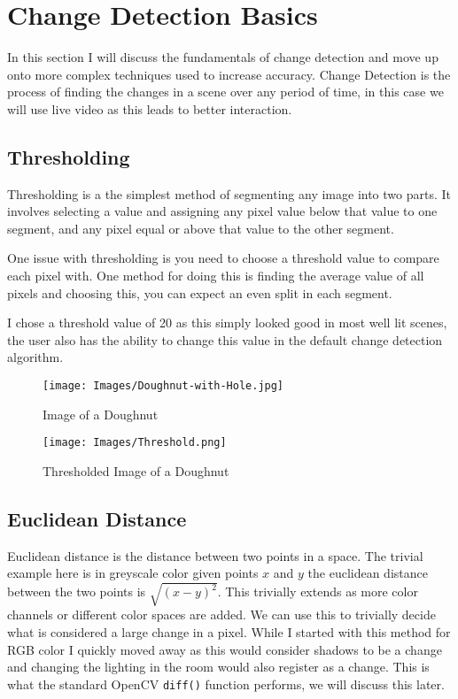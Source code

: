 \documentclass[a4paper]{report}
\begin{document}
\section{Change Detection Basics}
In this section I will discuss the fundamentals of change detection and move up onto more complex techniques used to increase accuracy. Change Detection is the process of finding the changes in a scene over any period of time, in this case we will use live video as this leads to better interaction.

\subsection{Thresholding}
Thresholding is a the simplest method of segmenting any image into two parts. It involves selecting a value and assigning any pixel value below that value to one segment, and any pixel equal or above that value to the other segment.

One issue with thresholding is you need to choose a threshold value to compare each pixel with. One method for doing this is finding the average value of all pixels and choosing this, you can expect an even split in each segment.

I chose a threshold value of 20 as this simply looked good in most well lit scenes, the user also has the ability to change this value in the default change detection algorithm.
\clearpage

\begin{figure}[!ht]
\centering
\texttt{[image: Images/Doughnut-with-Hole.jpg]}
\caption{\label{fig:Doughnut} Image of a Doughnut}
\end{figure}

\begin{figure}[!ht]
\centering
\texttt{[image: Images/Threshold.png]}
\caption{\label{fig:Doughnut} Thresholded Image of a Doughnut}
\end{figure}

\subsection{Euclidean Distance}
Euclidean distance is the distance between two points in a space. The trivial example here is in greyscale color given points $x$ and $y$ the euclidean distance between the two points is $\sqrt{(x-y)^2}$. This trivially extends as more color channels or different color spaces are added. We can use this to trivially decide what is considered a large change in a pixel. While I started with this method for RGB color I quickly moved away as this would consider shadows to be a change and changing the lighting in the room would also register as a change. This is what the standard OpenCV \verb|diff()| function performs, we will discuss this later.
\end{document}
